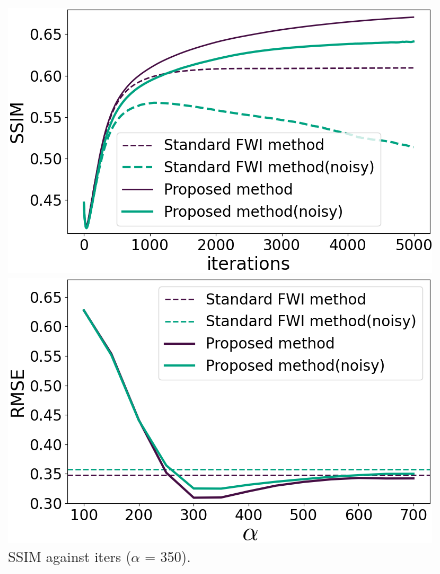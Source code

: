 \begin{figure}[htbp]
    \centering
    \hspace{-3mm}
    \begin{minipage}{58mm}
        \centering
        \includegraphics[width=\linewidth]{public/iters-ssim-all-colored}
        \caption{SSIM against iters ($\alpha$ = 350).}
        \label{fig:iters-ssim-noisy}
        \vspace{3mm}
    \end{minipage}
    \hspace{-1mm}
    \begin{minipage}{58mm}
        \centering
        \includegraphics[width=\linewidth]{public/alpha-rmse-colored}

\end{minipage}
\end{figure}
